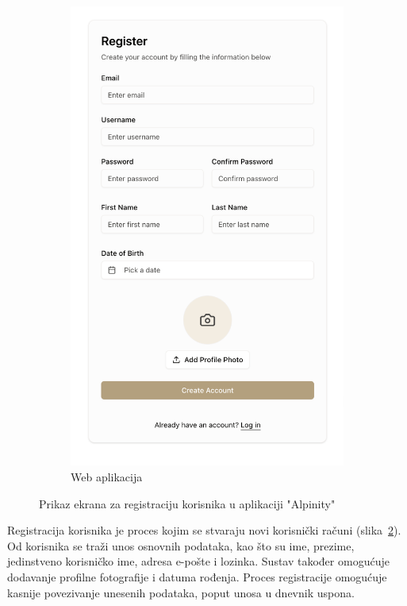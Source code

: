 \begin{figure}[H]
\begin{subfigure}{.5\textwidth}
    \includegraphics[width=1\linewidth]{images/implementacija/web/register.png}
    \caption{Web aplikacija}
    \label{fig:registracija2}
  \end{subfigure}
  \caption{Prikaz ekrana za registraciju korisnika u aplikaciji "Alpinity"}
  \label{fig:registracija_usporedba}
  \end{figure}


Registracija korisnika je proces kojim se stvaraju novi korisnički računi (slika~\ref{fig:registracija_usporedba}). Od korisnika se traži unos osnovnih podataka, kao što su ime, prezime, jedinstveno korisničko ime, adresa e-pošte i lozinka. Sustav također omogućuje dodavanje profilne fotografije i datuma rođenja. Proces registracije omogućuje kasnije povezivanje unesenih podataka, poput unosa u dnevnik uspona.

